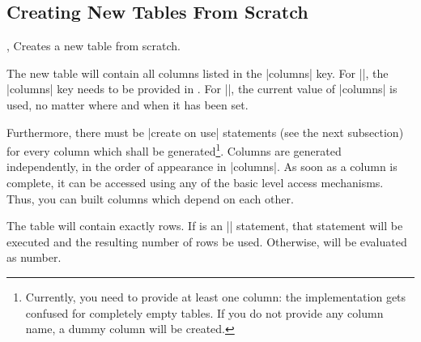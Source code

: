 \subsection{Creating New Tables From Scratch}
\begin{commandlist}{%
	\pgfplotstablenew{},%
	\pgfplotstablenew*{}}
	Creates a new table from scratch. 

	The new table will contain all columns listed in the |columns| key. For |\pgfplotstablenew|, the |columns| key needs to be provided in . For |\pgfplotstablenew*|, the current value of |columns| is used, no matter where and when it has been set.
	

	Furthermore, there must be |create on use| statements (see the next subsection) for every
	column which shall be generated\footnote{Currently, you need to provide at least one column: the implementation gets confused for completely empty tables. If you do not provide any column name, a dummy column will be created.}. Columns are generated
	independently, in the order of appearance in |columns|. As soon as a column is complete, it can be accessed using any of the basic level access mechanisms. Thus, you can built columns which depend on each other.

	The table will contain exactly  rows. If  is an |\pgfplotstablegetrowsof| statement, that statement will be executed and the resulting number of rows be  used. Otherwise,  will be evaluated as number.
\begin{codeexample}[]
\loadedtable
\pgfplotstabletypeset[empty cells with={---}]\loadedtable
\end{codeexample}

\begin{codeexample}[]
	\loadedtable
\pgfplotstabletypeset\loadedtable
\end{codeexample}
\end{commandlist}


